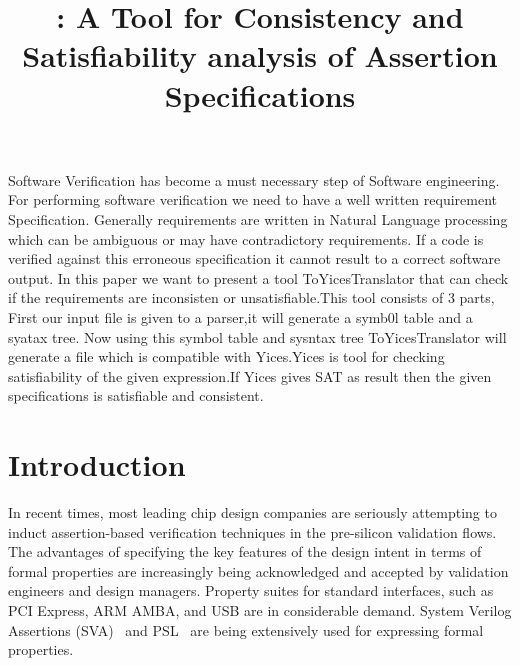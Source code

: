 \documentclass{svmult}
\begin{document}
\title{ : A Tool for Consistency and Satisfiability analysis of 
		Assertion Specifications}

\maketitle
\thispagestyle{empty}

\abstract
{
Software Verification has become a must necessary step of Software engineering.
For performing software verification we need to have a well written requirement 
Specification. Generally requirements are written in Natural Language processing
which can be ambiguous or may have contradictory requirements. If a code is verified 
against this erroneous specification it cannot result to a correct software output.
In this paper we want to present a tool ToYicesTranslator  that can check if the 
requirements are inconsisten or unsatisfiable.This tool consists of 3 parts, First 
our input file is given to a parser,it will generate a symb0l table and a syatax tree.
Now using this symbol table and sysntax tree ToYicesTranslator will generate a file 
which is compatible with Yices.Yices is tool for checking satisfiability of the given 
expression.If Yices gives SAT as result then the given specifications is satisfiable 
and consistent.
}


\section{Introduction}

In recent times, most leading chip design companies are seriously attempting 
to induct assertion-based verification techniques in the pre-silicon 
validation flows. The advantages of specifying the key features of the design 
intent in terms of formal properties are increasingly being 
acknowledged and accepted by validation engineers and design managers. 
Property suites for standard interfaces, such as PCI Express, ARM AMBA, and 
USB are in considerable demand. System Verilog Assertions 
(SVA)~\cite{roadmap} and 
PSL~\cite{roadmap} are being extensively used for expressing formal properties. 
\end{document}
